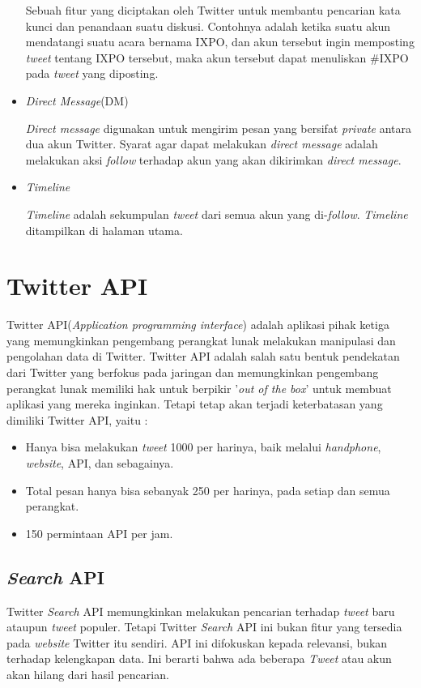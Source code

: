 \begin{itemize}
	Sebuah fitur yang diciptakan oleh Twitter untuk membantu pencarian kata kunci dan penandaan suatu diskusi. Contohnya adalah ketika suatu akun mendatangi suatu acara bernama IXPO, dan akun tersebut ingin memposting \textit{tweet} tentang IXPO tersebut, maka akun tersebut dapat menuliskan \#IXPO pada \textit{tweet} yang diposting.
	
	\item \textit{Direct Message}(DM)
	
	\textit{Direct message} digunakan untuk mengirim pesan yang bersifat \textit{private} antara dua akun Twitter. Syarat agar dapat melakukan \textit{direct message} adalah melakukan aksi \textit{follow} terhadap akun yang akan dikirimkan \textit{direct message}.
	\item \textit{Timeline}
	
	\textit{Timeline} adalah sekumpulan \textit{tweet} dari semua akun yang di-\textit{follow}. \textit{Timeline }ditampilkan di halaman utama.
\end{itemize}


\section{Twitter API \cite{Twitter}}
Twitter API(\textit{Application programming interface}) adalah aplikasi pihak ketiga yang memungkinkan pengembang perangkat lunak melakukan manipulasi dan pengolahan data di Twitter. Twitter API adalah salah satu bentuk pendekatan dari Twitter yang berfokus pada jaringan dan memungkinkan pengembang perangkat lunak memiliki hak untuk berpikir '\textit{out of the box}' untuk membuat aplikasi yang mereka inginkan\cite{Twitter}. Tetapi tetap akan terjadi keterbatasan yang dimiliki Twitter API, yaitu :
\begin{itemize}
	\item Hanya bisa melakukan \textit{tweet} 1000 per harinya, baik melalui \textit{handphone}, \textit{website}, API, dan sebagainya.
	\item Total pesan hanya bisa sebanyak 250 per harinya, pada setiap dan semua perangkat.
	\item 150 permintaan API per jam.
\end{itemize}

\subsection{\textit{Search} API}

Twitter \textit{Search} API memungkinkan melakukan pencarian terhadap \textit{tweet} baru ataupun \textit{tweet} populer. Tetapi Twitter \textit{Search} API ini bukan fitur yang tersedia pada \textit{website} Twitter itu sendiri. API ini difokuskan kepada relevansi, bukan terhadap kelengkapan data\cite{Twitter}. Ini berarti bahwa ada beberapa \textit{Tweet} atau akun akan hilang dari hasil pencarian.

